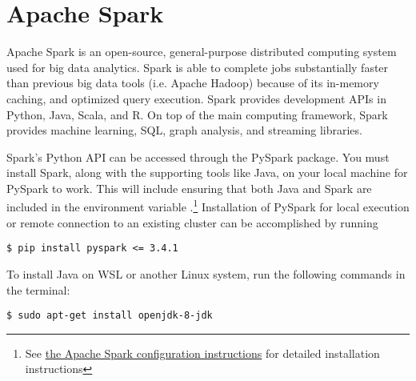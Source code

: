 

\section*{Apache Spark} %
Apache Spark is an open-source, general-purpose distributed computing system used for big data analytics.
Spark is able to complete jobs substantially faster than previous big data tools (i.e. Apache Hadoop) because of its in-memory caching, and optimized query execution.
Spark provides development APIs in Python, Java, Scala, and R.
On top of the main computing framework, Spark provides machine learning, SQL, graph analysis, and streaming libraries.

Spark's Python API can be accessed through the PySpark package.
You must install Spark, along with the supporting tools like Java, on your local machine for PySpark to work. 
This will include ensuring that both Java and Spark are included in the environment variable .\footnote{See \href{https://spark.apache.org/docs/latest/}{the Apache Spark configuration instructions} for detailed installation instructions}
Installation of PySpark for local execution or remote connection to an existing cluster can be accomplished by running
\begin{lstlisting}
$ pip install pyspark <= 3.4.1
\end{lstlisting}

To install Java on WSL or another Linux system, run the following commands in the terminal:
\begin{lstlisting}
$ sudo apt-get install openjdk-8-jdk 
\end{lstlisting}

